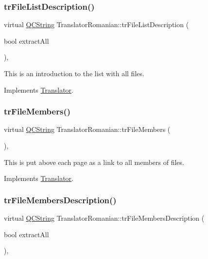 \subsubsection{\texorpdfstring{trFileListDescription()}{trFileListDescription()}}
{\footnotesize\ttfamily virtual \mbox{\hyperlink{class_q_c_string}{Q\+C\+String}} Translator\+Romanian\+::tr\+File\+List\+Description (\begin{DoxyParamCaption}\item[{bool}]{extract\+All }\end{DoxyParamCaption})\hspace{0.3cm}{\ttfamily [inline]}, {\ttfamily [virtual]}}

This is an introduction to the list with all files. 

Implements \mbox{\hyperlink{class_translator}{Translator}}.

\mbox{\label{class_translator_romanian_a6fe7abbd713f867771f1afeac8927286}} 
\subsubsection{\texorpdfstring{trFileMembers()}{trFileMembers()}}
{\footnotesize\ttfamily virtual \mbox{\hyperlink{class_q_c_string}{Q\+C\+String}} Translator\+Romanian\+::tr\+File\+Members (\begin{DoxyParamCaption}{ }\end{DoxyParamCaption})\hspace{0.3cm}{\ttfamily [inline]}, {\ttfamily [virtual]}}

This is put above each page as a link to all members of files. 

Implements \mbox{\hyperlink{class_translator}{Translator}}.

\mbox{\label{class_translator_romanian_a0b465aca37f2924b9c60151a6b3d058c}} 
\subsubsection{\texorpdfstring{trFileMembersDescription()}{trFileMembersDescription()}}
{\footnotesize\ttfamily virtual \mbox{\hyperlink{class_q_c_string}{Q\+C\+String}} Translator\+Romanian\+::tr\+File\+Members\+Description (\begin{DoxyParamCaption}\item[{bool}]{extract\+All }\end{DoxyParamCaption})\hspace{0.3cm}{\ttfamily [inline]}, {\ttfamily [virtual]}}

